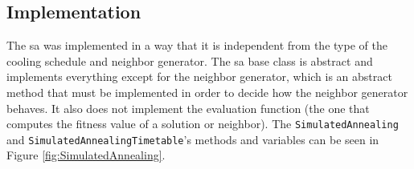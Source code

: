 \subsection{Implementation}

The \gls{sa} was implemented in a way that it is independent from the type of the cooling schedule and neighbor generator. The \gls{sa} base class is abstract and implements everything except for the neighbor generator, which is an abstract method that must be implemented in order to decide how the neighbor generator behaves. It also does not implement the evaluation function (the one that computes the fitness value of a solution or neighbor). The \verb+SimulatedAnnealing+ and \verb+SimulatedAnnealingTimetable+'s methods and variables can be seen in Figure \ref{fig:SimulatedAnnealing}.\\
\\
